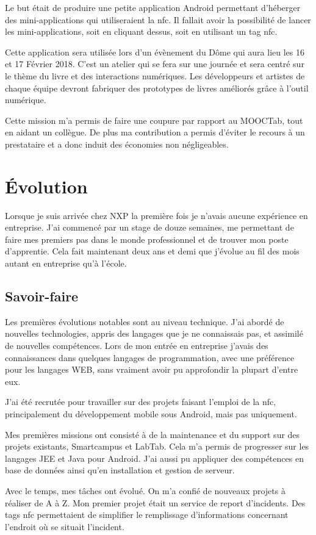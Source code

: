 \documentclass[french,12pt,a4paper,titlepage,openright,openbib]{report}
\begin{document}
Le but était de produire une petite application Android permettant d'héberger des mini-applications qui utiliseraient la \gls{nfc}. Il fallait avoir la possibilité de lancer les mini-applications, soit en cliquant dessus, soit en utilisant un tag \gls{nfc}.

Cette application sera utilisée lors d'un évènement du Dôme \cite{website:ledome} qui aura lieu les 16 et 17 Février 2018. C'est un atelier qui se fera sur une journée et sera centré sur le thème du livre et des interactions numériques. Les développeurs et artistes de chaque équipe devront fabriquer des prototypes de livres améliorés grâce à l'outil numérique.

Cette mission m'a permis de faire une coupure par rapport au MOOCTab, tout en aidant un collègue. De plus ma contribution a permis d'éviter le recours à un prestataire et a donc induit des économies non négligeables.
\chapter{Évolution}
Lorsque je suis arrivée chez NXP la première fois je n'avais aucune expérience en entreprise. J'ai commencé par un stage de douze semaines, me permettant de faire mes premiers pas dans le monde professionnel et de trouver mon poste d'apprentie.
Cela fait maintenant deux ans et demi que j'évolue au fil des mois autant en entreprise qu'à l'école.
\section{Savoir-faire}
Les premières évolutions notables sont au niveau technique. J'ai abordé de nouvelles technologies, appris des langages que je ne connaissais pas, et assimilé de nouvelles compétences.
Lors de mon entrée en entreprise j'avais des connaissances dans quelques langages de programmation, avec une préférence pour les langages WEB, sans vraiment avoir pu approfondir la plupart d'entre eux.

J'ai été recrutée pour travailler sur des projets faisant l'emploi de la \gls{nfc}, principalement du développement mobile sous Android, mais pas uniquement.

Mes premières missions ont consisté à de la maintenance et du support sur des projets existants, Smartcampus et LabTab. Cela m'a permis de progresser sur les langages JEE et Java pour Android. J'ai aussi pu appliquer des compétences en base de données ainsi qu'en installation et gestion de serveur.

Avec le temps, mes tâches ont évolué. On m'a confié de nouveaux projets à réaliser de A à Z.
Mon premier projet était un service de report d'incidents. Des tags \gls{nfc} permettaient de simplifier le remplissage d'informations concernant l'endroit où se situait l'incident.
\end{document}
